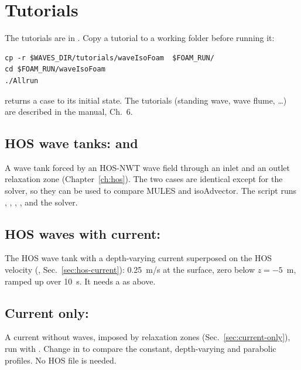 \chapter{Tutorials}
\label{ch:tutorials}

The tutorials are in . Copy a tutorial to a working folder before running it:
\begin{lstlisting}[style=shell]
cp -r $WAVES_DIR/tutorials/waveIsoFoam  $FOAM_RUN/
cd $FOAM_RUN/waveIsoFoam
./Allrun
\end{lstlisting}
 returns a case to its initial state. The \wtwof{} tutorials (standing wave,
wave flume, \ldots) are described in the \wtwof{} manual, Ch.~6.

\section{HOS wave tanks: \texorpdfstring{}{waveFoam} and \texorpdfstring{}{waveIsoFoam}}
A wave tank forced by an HOS-NWT wave field through an inlet and an outlet
relaxation zone (Chapter~\ref{ch:hos}). The two cases are identical except for the solver, so
they can be used to compare MULES and isoAdvector. The  script runs
, , ,
,  and the solver.


\section{HOS waves with current: \texorpdfstring{}{HOS\_with\_Current}}
The HOS wave tank with a depth-varying current superposed on the HOS velocity
(, Sec.~\ref{sec:hos-current}): 0.25~m/s at the surface, zero below
$z=-5$~m, ramped up over 10~s. It needs a  as above.

\section{Current only: \texorpdfstring{}{CurrentWithProfile}}
A current without waves, imposed by  relaxation zones
(Sec.~\ref{sec:current-only}), run with . Change  in
 to compare the constant, depth-varying and parabolic
profiles. No HOS file is needed.

